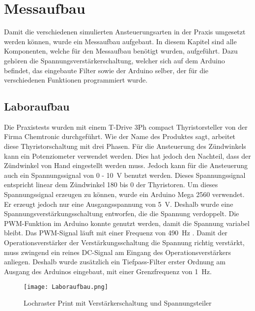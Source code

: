 \section{Messaufbau}
Damit die verschiedenen simulierten Ansteuerungsarten in der Praxis umgesetzt werden können, wurde ein Messaufbau aufgebaut. In diesem Kapitel sind alle Komponenten, welche für den Messaufbau benötigt wurden, aufgeführt. Dazu gehören die Spannungsverstärkerschaltung, welcher sich auf dem Arduino befindet, das eingebaute Filter sowie der Arduino selber, der für die verschiedenen Funktionen programmiert wurde.
\subsection{Laboraufbau}
Die Praxistests wurden mit einem \grqq T-Drive 3Ph compact Thyristorsteller\grqq \hspace{0.02cm} von der Firma Chemtronic durchgeführt. Wie der Name des Produktes sagt, arbeitet diese Thyristorschaltung mit drei Phasen. Für die Ansteuerung des Zündwinkels kann ein Potenziometer verwendet werden. Dies hat jedoch den Nachteil, dass der Zündwinkel von Hand eingestellt werden muss. Jedoch kann für die Ansteuerung auch ein Spannungssignal von 0 - \SI{10}{V} benutzt werden. Dieses Spannungssignal entspricht linear dem Zündwinkel 180\textdegree \hspace{0.02cm} bis 0\textdegree \hspace{0.02cm} der Thyristoren. Um dieses Spannungssignal erzeugen zu können, wurde ein Arduino Mega 2560 verwendet. Er erzeugt jedoch nur eine Ausgangsspannung von \SI{5}{V}. Deshalb wurde eine Spannungsverstärkungsschaltung entworfen, die die Spannung verdoppelt. Die PWM-Funktion im Arduino konnte genutzt werden, damit die Spannung variabel bleibt. Das PWM-Signal läuft mit einer Frequenz von \SI{490}{Hz} \cite{Arduino_PWM}. 
Damit der Operationsverstärker der Verstärkungsschaltung die Spannung richtig verstärkt, muss zwingend ein reines DC-Signal am Eingang des Operationsverstärkers anliegen. Deshalb wurde zusätzlich ein Tiefpass-Filter erster Ordnung am Ausgang des Arduinos eingebaut, mit einer Grenzfrequenz von \SI{1}{Hz}.  

\begin{figure}[ht!]  
	\centering
	\texttt{[image: Laboraufbau.png]}	
	\caption{Lochraster Print mit Verstärkerschaltung und Spannungsteiler}\label{fig:Laboraufbau}
\end{figure}

